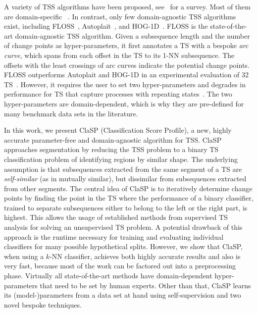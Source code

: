 \documentclass[pdflatex,sn-basic]{sn-jnl}
\begin{document}
A variety of TSS algorithms have been proposed, see~\citep{aminikhanghahi2017survey} for a survey. Most of them are domain-specific ~\citep{brahim2004gaussian, bosc2003automatic, Zenisek2019MachineLB}. In contrast, only few domain-agnostic TSS algorithms exist, including FLOSS~\citep{gharghabi2017matrix}, Autoplait~\citep{matsubara2014autoplait}, and HOG-1D~\citep{zhao2016decomposing}. FLOSS is the state-of-the-art domain-agnostic TSS algorithm. Given a subsequence length and the number of change points as hyper-parameters, it first annotates a TS with a bespoke \emph{arc curve}, which spans from each offset in the TS to its 1-NN subsequence. The offsets with the least crossings of arc curves indicate the potential change points. FLOSS outperforms Autoplait and HOG-1D in an experimental evaluation of 32 TS~\citep{gharghabi2017matrix}. However, it requires the user to set two hyper-parameters and degrades in performance for TS that capture processes with repeating states~\citep{Deldari2020ESPRESSOEA}. The two hyper-parameters are domain-dependent, which is why they are pre-defined for many benchmark data sets in the literature.

In this work, we present ClaSP (Classification Score Profile), a new, highly accurate parameter-free and domain-agnostic algorithm for TSS. ClaSP approaches segmentation by reducing the TSS problem to a binary TS classification problem of identifying regions by similar shape. The underlying assumption is that subsequences extracted from the same segment of a TS are \emph{self-similar} (as in mutually similar), but dissimilar from subsequences extracted from other segments. The central idea of ClaSP is to iteratively determine change points by finding the point in the TS where the performance of a binary classifier, trained to separate subsequences either to belong to the left or the right part, is highest. This allows the usage of established methods from supervised TS analysis for solving an unsupervised TS problem. A potential drawback of this approach is the runtime necessary for training and evaluating individual classifiers for many possible hypothetical splits. However, we show that ClaSP, when using a $k$-NN classifier, achieves both highly accurate results and also is very fast, because most of the work can be factored out into a preprocessing phase. Virtually all state-of-the-art methods have domain-dependent hyper-parameters that need to be set by human experts. Other than that, ClaSP learns its (model-)parameters from a data set at hand using self-supervision and two novel bespoke techniques.
\end{document}
